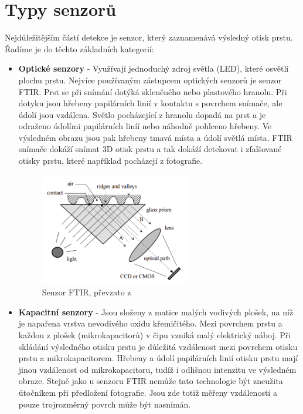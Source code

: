 \section{Typy senzorů}
Nejdůležitějším částí detekce je senzor, který zaznamenává výsledný otisk prstu. Řadíme je do těchto základních kategorií:
\begin{itemize}
\item \textbf{Optické senzory} - Využívají jednoduchý zdroj světla (LED), které osvětlí plochu prstu.\cite{Drahansky} Nejvíce používaným zástupcem optických senzorů je senzor FTIR. Prst se při snímání dotýká skleněného nebo plastového hranolu. Při dotyku jsou hřebeny papilárních linií v kontaktu s povrchem snímače, ale údolí jsou vzdálena. Světlo pocházející z hranolu dopadá na prst a je odraženo údolími papilárních liníí nebo náhodně pohlceno hřebeny. Ve výsledném obrazu jsou pak hřebeny tmavá místa a údolí světlá místa. FTIR snímače dokáží snímat 3D otisk prstu a tak dokáží detekovat i zfalšované otisky prstu, které například pocházejí z fotografie. \cite{Maltoni2009}

\begin{figure}[htbp]
    \centering
    \includegraphics[width=250]{obrazky-figures/ftiredit.png}
    \caption{Senzor FTIR, převzato z \cite{Maltoni2009}}
    \label{fig:ftir}
\end{figure}

\item \textbf{Kapacitní senzory} - Jsou složeny z matice malých vodivých plošek, na níž je napařena vrstva nevodivého oxidu křemičitého.\cite{Drahansky} Mezi povrchem prstu a každou z plošek (mikrokapacitorů) v čipu vzniká malý elektrický náboj. Při skládání výsledného otisku prstu je důležitá vzdálenost mezi povrchem otisku prstu a mikrokapacitorem. Hřebeny a údolí papilárních linií otisku prstu mají jinou vzdálenost od mikrokapacitoru, tudíž i odlišnou intenzitu ve výsledném obraze. Stejně jako u senzoru FTIR nemůže tato technologie být zneužita útočníkem při předložení fotografie. Jsou zde totiž měřeny vzdálenosti a pouze trojrozměrný povrch může být nasnímán.\cite{Maltoni2009}


\end{itemize}
